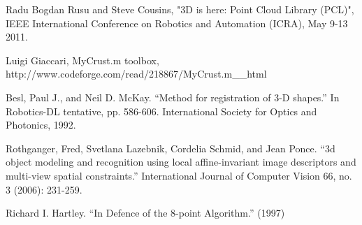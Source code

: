 \documentclass[11pt,twocolumn]{article}
\begin{document}
\begin{thebibliography}{9}

Radu Bogdan Rusu and Steve Cousins, "3D is here: Point Cloud Library (PCL)", IEEE International Conference on Robotics and Automation (ICRA), May 9-13 2011.

Luigi Giaccari, MyCrust.m toolbox,
http://www.codeforge.com/read/218867/MyCrust.m__html

Besl, Paul J., and Neil D. McKay. ``Method for registration of 3-D shapes.'' In Robotics-DL tentative, pp. 586-606. International Society for Optics and Photonics, 1992.

Rothganger, Fred, Svetlana Lazebnik, Cordelia Schmid, and Jean Ponce. ``3d object modeling and recognition using local affine-invariant image descriptors and multi-view spatial constraints.'' International Journal of Computer Vision 66, no. 3 (2006): 231-259.

Richard I. Hartley. ``In Defence of the 8-point Algorithm.'' (1997)


\end{thebibliography}
\end{document}
